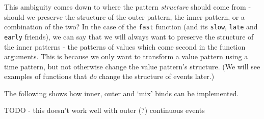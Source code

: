 This ambiguity comes down to where the pattern \emph{structure} should
come from - should we preserve the structure of the outer pattern, the
inner pattern, or a combination of the two? In the case of the
\texttt{fast} function (and its \texttt{slow}, \texttt{late} and
\texttt{early} friends), we can say that we will always want to preserve
the structure of the inner patterns - the patterns of values which come
second in the function arguments. This is because we only want to
transform a value pattern using a time pattern, but not otherwise change
the value pattern's structure. (We will see examples of functions that
\emph{do} change the structure of events later.)

The following shows how inner, outer and `mix' binds can be implemented.

TODO - this doesn't work well with outer (?) continuous events

\begin{Shaded}
\begin{Highlighting}[]
\NormalTok{ (}  \OtherTok{{-}\textgreater{}}   \OtherTok{{-}\textgreater{}}  \NormalTok{) }\OtherTok{{-}\textgreater{}}
                \OtherTok{{-}\textgreater{}}\OtherTok{{-}\textgreater{}} \OtherTok{{-}\textgreater{}} 
\OtherTok{=}  \OperatorTok{$} 
  \OtherTok{=} \OperatorTok{$}\OperatorTok{$}\OperatorTok{$}
\OtherTok{=}\OtherTok{=}

 \OtherTok{{-}\textgreater{}}\OtherTok{{-}\textgreater{}} \OtherTok{{-}\textgreater{}} 
\OtherTok{=} \NormalTok{)}

 \OtherTok{{-}\textgreater{}}\OtherTok{{-}\textgreater{}} \OtherTok{{-}\textgreater{}} 
\OtherTok{=}

 \OtherTok{{-}\textgreater{}}\OtherTok{{-}\textgreater{}} \OtherTok{{-}\textgreater{}} 
\OtherTok{=}
\end{Highlighting}
\end{Shaded}

